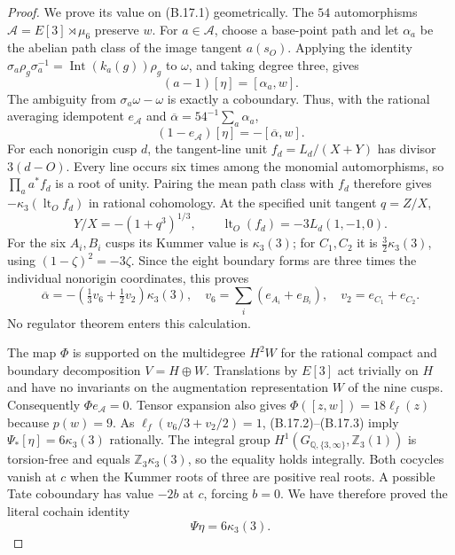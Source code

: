 \begin{proof}
We prove its value on (B.17.1) geometrically. The $54$
automorphisms $\mathcal A=E[3]\rtimes\mu_6$ preserve $w$.
For $a\in\mathcal A$, choose a base-point path and let
$\alpha_a$ be the abelian path class of the image tangent
$a(s_O)$. Applying the identity
$\sigma_a\rho_g\sigma_a^{-1}=\operatorname{Int}(k_a(g))\rho_g$
to $\omega$, and taking degree three, gives
\[
       (a-1)[\eta]=[\alpha_a,w].
\]
The ambiguity from $\sigma_a\omega-\omega$ is exactly a
coboundary. Thus, with the rational averaging idempotent
$e_{\mathcal A}$ and
$\overline\alpha=54^{-1}\sum_a\alpha_a$,
\[
          (1-e_{\mathcal A})[\eta]=-[\overline\alpha,w].
                                                               \tag{B.17.2}
\]
For each nonorigin cusp $d$, the tangent-line unit
$f_d=L_d/(X+Y)$ has divisor $3(d-O)$. Every line occurs six
times among the monomial automorphisms, so
$\prod_a a^*f_d$ is a root of unity. Pairing the mean path
class with $f_d$ therefore gives
$-\kappa_3(\operatorname{lt}_O f_d)$ in rational cohomology.
At the specified unit tangent $q=Z/X$,
\[
 Y/X=-(1+q^3)^{1/3},\qquad
          \operatorname{lt}_O(f_d)=-3L_d(1,-1,0).
\]
For the six $A_i,B_i$ cusps its Kummer value is
$\kappa_3(3)$; for $C_1,C_2$ it is
$\tfrac32\kappa_3(3)$, using
$(1-\zeta)^2=-3\zeta$. Since the eight boundary forms are
three times the individual nonorigin coordinates, this proves
\[
 \overline\alpha=-\left(\tfrac13v_6+\tfrac12v_2\right)
                       \kappa_3(3),\quad
 v_6=\sum_i(e_{A_i}+e_{B_i}),\quad v_2=e_{C_1}+e_{C_2}.
                                                               \tag{B.17.3}
\]
No regulator theorem enters this calculation.

The map $\Phi$ is supported on the multidegree $H^2W$ for
the rational compact and boundary decomposition $V=H\oplus W$.
Translations by $E[3]$ act trivially on $H$ and have no
invariants on the augmentation representation $W$ of the nine
cusps. Consequently $\Phi e_{\mathcal A}=0$. Tensor expansion
also gives $\Phi([z,w])=18\ell_f(z)$ because $p(w)=9$.
As $\ell_f(v_6/3+v_2/2)=1$, (B.17.2)--(B.17.3) imply
$\Psi_*[\eta]=6\kappa_3(3)$ rationally. The integral group
$H^1(G_{\mathbb Q,\{3,\infty\}},\mathbb Z_3(1))$
is torsion-free and equals $\mathbb Z_3\kappa_3(3)$, so the
equality holds integrally. Both cocycles vanish at $c$ when
the Kummer roots of three are positive real roots. A possible
Tate coboundary has value $-2b$ at $c$, forcing $b=0$. We have
therefore proved the literal cochain identity
\[
                         \Psi\eta=6\kappa_3(3).                 \tag{B.17.4}
\]


\end{proof}

